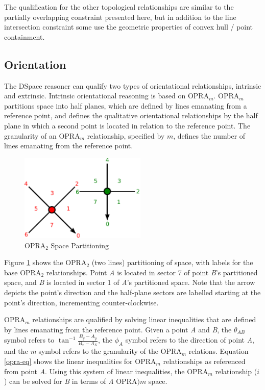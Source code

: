 \documentclass[12pt]{ucthesis}
\begin{document}
The qualification for the other topological relationships are similar to the partially overlapping constraint presented here, but in addition to the line intersection constraint some use the geometric properties of convex hull / point containment.

\subsection{Orientation} \label{orientation}
The DSpace reasoner can qualify two types of orientational relationships, intrinsic and extrinsic. Intrinsic orientational reasoning is based on OPRA$_{m}$. OPRA$_{m}$ partitions space into half planes, which are defined by lines emanating from a reference point, and defines the qualitative orientational relationships by the half plane in which a second point is located in relation to the reference point. The granularity of an OPRA$_{m}$ relationship, specified by $m$, defines the number of lines emanating from the reference point. 

\begin{figure}[b]
\centering
\includegraphics[width=60mm]{facing-opra-base-rel}
\caption{OPRA$_{2}$ Space Partitioning}
\label{facing-opra-base-rel}
\end{figure}

Figure \ref{facing-opra-base-rel} shows the OPRA$_{2}$ (two lines) partitioning of space, with labels for the base OPRA$_{2}$ relationships. Point \emph{A} is located in sector 7 of point \emph{B}'s partitioned space, and \emph{B} is located in sector 1 of \emph{A}'s partitioned space. Note that the arrow depicts the point's direction and the half-plane sectors are labelled starting at the point's direction, incrementing counter-clockwise. 

OPRA$_{m}$ relationships are qualified by solving linear inequalities that are defined by lines emanating from the reference point. Given a point \emph{A} and \emph{B}, the $\theta_{AB}$ symbol refers to $ \tan^{-1} \frac{B_{y} - A_{y}}{B_{x} - A_{X}} $, the $\phi_{A}$ symbol refers to the direction of point \emph{A}, and the \emph{m} symbol refers to the granularity of the OPRA$_{m}$ relations. Equation \ref{opra-eq} shows the linear inequalities for OPRA$_{m}$ relationships as referenced from point \emph{A}. Using this system of linear inequalities, the OPRA$_{m}$ relationship ($i$) can be solved for \emph{B} in terms of \emph{A} OPRA$){m}$ space.
\end{document}
